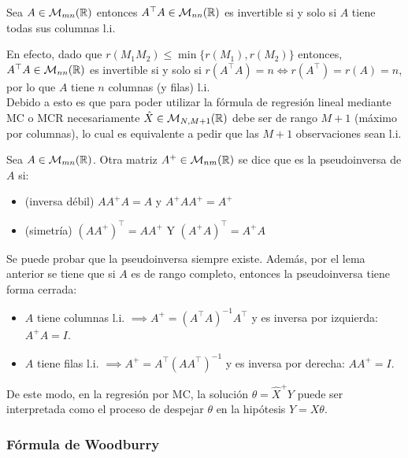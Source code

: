 \begin{lemma}
	Sea $A\in\mathcal{M}_{mn}(\mathbb{R})$ entonces $A^\top A \in\mathcal{M}_{nn}(\mathbb{R})$ es invertible si y solo si $A$ tiene todas sus columnas l.i.
\end{lemma}

En efecto, dado que $r(M_1M_2)\leq\min\{r(M_1),r(M_2)\}$ entonces, $A^\top A \in\mathcal{M}_{nn}(\mathbb{R})$ es invertible si y solo si $r(A^\top A)=n\iff r(A^\top )=r(A)=n$, por lo que $A$ tiene $n$ columnas (y filas) l.i.\\

Debido a esto es que para poder utilizar la fórmula de regresión lineal mediante MC o MCR necesariamente $\hat{X} \in\mathcal{M}_{N,M+1}(\mathbb{R})$ debe ser de rango $M+1$ (máximo por columnas), lo cual es equivalente a pedir que las $M+1$ observaciones sean l.i.\\

\begin{definition} Sea $A\in\mathcal{M}_{mn}(\mathbb{R})$. Otra matriz $A^+\in\mathcal{M}_{nm}(\mathbb{R})$ se dice que es la pseudoinversa de $A$ si:

\begin{itemize}
	\item (inversa débil) $AA^+A=A$ y $A^+AA^+=A^+$
	\item (simetría) $(AA^+)^\top  = AA^+$ Y $(A^+A)^\top  = A^+A$
\end{itemize}
	
\end{definition}

Se puede probar que la pseudoinversa siempre existe. Además, por el lema anterior se tiene que si $A$ es de rango completo, entonces la pseudoinversa tiene forma cerrada:

\begin{itemize}
	\item $A$ tiene columnas l.i. $\implies A^+=(A^\top A)^{-1}A^\top $ y es inversa por izquierda: $A^+A=I$.
	\item $A$ tiene filas l.i. $\implies A^+=A^\top (AA^\top )^{-1}$ y es inversa por derecha: $AA^+=I$.
\end{itemize}

De este modo, en la regresión por MC, la solución $\theta=\hat{X}^+Y$ puede ser interpretada como el proceso de despejar $\theta$ en la hipótesis $Y=X\theta$.

\subsubsection{Fórmula de Woodburry}

